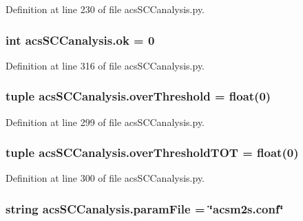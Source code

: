 Definition at line 230 of file acs\-S\-C\-Canalysis.\-py.

\hypertarget{a00096_a9ce833d782f17d858941cfa76914599a}{
\subsubsection[{ok}]{\setlength{\rightskip}{0pt plus 5cm}int acs\-S\-C\-Canalysis.\-ok = 0}}\label{a00096_a9ce833d782f17d858941cfa76914599a}


Definition at line 316 of file acs\-S\-C\-Canalysis.\-py.

\hypertarget{a00096_a12e61f8d7aadb52256a7728af342bae3}{
\subsubsection[{over\-Threshold}]{\setlength{\rightskip}{0pt plus 5cm}tuple acs\-S\-C\-Canalysis.\-over\-Threshold = float(0)}}\label{a00096_a12e61f8d7aadb52256a7728af342bae3}


Definition at line 299 of file acs\-S\-C\-Canalysis.\-py.

\hypertarget{a00096_a93de20dd9ebf791127ac5aefc0a2df8d}{
\subsubsection[{over\-Threshold\-T\-O\-T}]{\setlength{\rightskip}{0pt plus 5cm}tuple acs\-S\-C\-Canalysis.\-over\-Threshold\-T\-O\-T = float(0)}}\label{a00096_a93de20dd9ebf791127ac5aefc0a2df8d}


Definition at line 300 of file acs\-S\-C\-Canalysis.\-py.

\hypertarget{a00096_a7160f8e48b4aafebbd75e9037fc9fef7}{
\subsubsection[{param\-File}]{\setlength{\rightskip}{0pt plus 5cm}string acs\-S\-C\-Canalysis.\-param\-File = \char`\"{}acsm2s.\-conf\char`\"{}}}\label{a00096_a7160f8e48b4aafebbd75e9037fc9fef7}


